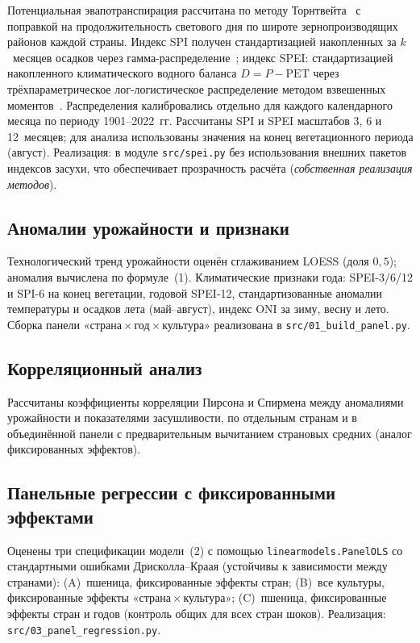 \documentclass[14pt,a4paper]{extarticle}
\begin{document}
Потенциальная эвапотранспирация рассчитана по методу Торнтвейта~\cite{thornthwaite1948} с поправкой на продолжительность светового дня по широте зернопроизводящих районов каждой страны. Индекс SPI получен стандартизацией накопленных за $k$~месяцев осадков через гамма-распределение~\cite{mckee1993}; индекс SPEI: стандартизацией накопленного климатического водного баланса $D=P-\text{PET}$ через трёхпараметрическое лог-логистическое распределение методом взвешенных моментов~\cite{vicenteserrano2010,begueria2014}. Распределения калибровались отдельно для каждого календарного месяца по периоду 1901--2022~гг. Рассчитаны SPI и SPEI масштабов 3, 6 и 12~месяцев; для анализа использованы значения на конец вегетационного периода (август). Реализация: в модуле \texttt{src/spei.py} без использования внешних пакетов индексов засухи, что обеспечивает прозрачность расчёта (\emph{собственная реализация методов}).

\subsection{Аномалии урожайности и признаки}

Технологический тренд урожайности оценён сглаживанием LOESS (доля $0{,}5$); аномалия вычислена по формуле~(1). Климатические признаки года: SPEI-3/6/12 и SPI-6 на конец вегетации, годовой SPEI-12, стандартизованные аномалии температуры и осадков лета (май--август), индекс ONI за зиму, весну и лето. Сборка панели «страна\,$\times$\,год\,$\times$\,культура» реализована в \texttt{src/01\_build\_panel.py}.

\subsection{Корреляционный анализ}

Рассчитаны коэффициенты корреляции Пирсона и Спирмена между аномалиями урожайности и показателями засушливости, по отдельным странам и в объединённой панели с предварительным вычитанием страновых средних (аналог фиксированных эффектов).

\subsection{Панельные регрессии с фиксированными эффектами}

Оценены три спецификации модели~(2) с помощью \texttt{linearmodels.PanelOLS} со стандартными ошибками Дрисколла–Краая (устойчивы к зависимости между странами): (A)~пшеница, фиксированные эффекты стран; (B)~все культуры, фиксированные эффекты «страна\,$\times$\,культура»; (C)~пшеница, фиксированные эффекты стран и годов (контроль общих для всех стран шоков). Реализация: \texttt{src/03\_panel\_regression.py}.
\end{document}
